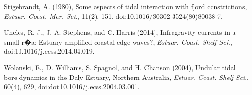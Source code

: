 \begin{thebibliography}
Stigebrandt,
A. (1980), Some aspects of tidal interaction with fjord constrictions,
\emph{Estuar. Coast. Mar. Sci.}, 11(2), 151, doi:10.1016/S0302-3524(80)80038-7. 

Uncles, R.
J., J. A. Stephens, and C. Harris (2014), Infragravity currents in
a small r�a: Estuary-amplified coastal edge waves?, \emph{Estuar.
Coast. Shelf Sci}., doi:10.1016/j.ecss.2014.04.019. 

Wolanski,
E., D. Williams, S. Spagnol, and H. Chanson (2004), Undular tidal
bore dynamics in the Daly Estuary, Northern Australia, \emph{Estuar.
Coast. Shelf Sci}., 60(4), 629, doi:doi:10.1016/j.ecss.2004.03.001. 

\end{thebibliography}